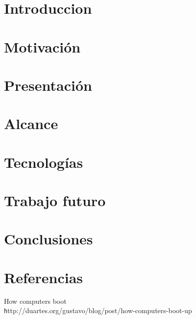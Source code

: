 \documentclass[12pt, a4paper, twoside]{article}
\begin{document}
{}



\clearpage{\pagestyle{empty}\clearpage}
\setcounter{page}{1}


\begin{TP}




\section{Introduccion}

\section{Motivación}
\section{Presentación}
\section{Alcance}
\section{Tecnologías}
\section{Trabajo futuro}
\section{Conclusiones}


\clearpage
\section{Referencias}
\begin{thebibliography}{1}

     How computers boot \\
    {\texttt http://duartes.org/gustavo/blog/post/how-computers-boot-up}

\end{thebibliography}


\end{TP}
\end{document}
